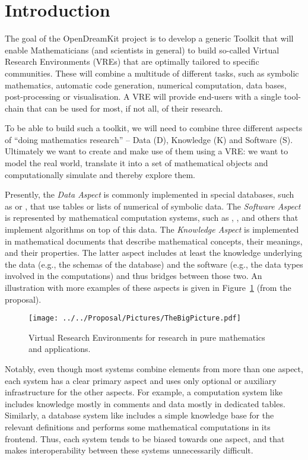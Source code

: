 \section{Introduction}\label{sec:intro}

The goal of the OpenDreamKit project \cite{ODKproposal:on} is to develop a generic Toolkit
that will enable Mathematicians (and scientists in general) to build so-called Virtual
Research Environments (VREs) that are optimally tailored to specific communities. These
will combine a multitude of different tasks, such as symbolic mathematics, automatic code
generation, numerical computation, data bases, post-processing or visualisation. A VRE
will provide end-users with a single tool-chain that can be used for most, if not all, of
their research.

To be able to build such a toolkit, we will need to combine three different aspects of
``doing mathematics research'' -- Data (D), Knowledge (K) and Software (S). Ultimately we want to
create and make use of them using a VRE: we want to model the real world, translate it
into a set of mathematical objects and computationally simulate and thereby explore them.

Presently, the \emph{Data Aspect} is commonly implemented in special databases, such as
\LMFDB or \OEIS, that use tables or lists of numerical of symbolic data. The
\emph{Software Aspect} is represented by mathematical computation systems, such as \GAP,
\SageMath, and others that implement algorithms on top of this data. The \emph{Knowledge
  Aspect} is implemented in mathematical documents that describe mathematical concepts,
their meanings, and their properties.  The latter aspect includes at least the knowledge
underlying the data (e.g., the schemas of the database) and the software (e.g., the data
types involved in the computations) and thus bridges between those two. An illustration
with more examples of these aspects is given in Figure~\ref{fig:thebigpicture} (from the
\pn proposal).

\begin{figure}[ht]\centering
  \texttt{[image: ../../Proposal/Pictures/TheBigPicture.pdf]}
  \caption{Virtual Research Environments for research in pure
    mathematics and applications.}
  \label{fig:thebigpicture}
\end{figure}

Notably, even though most systems combine elements from more than one aspect, each system has a clear primary aspect and uses only optional or auxiliary infrastructure for the other aspects.
For example, a computation system like \SageMath includes knowledge mostly in comments and data mostly in dedicated tables.
Similarly, a database system like \LMFDB includes a simple knowledge base for the relevant definitions and performs some mathematical computations in its frontend.
Thus, each system tends to be biased towards one aspect, and that makes interoperability between these systems unnecessarily difficult.

